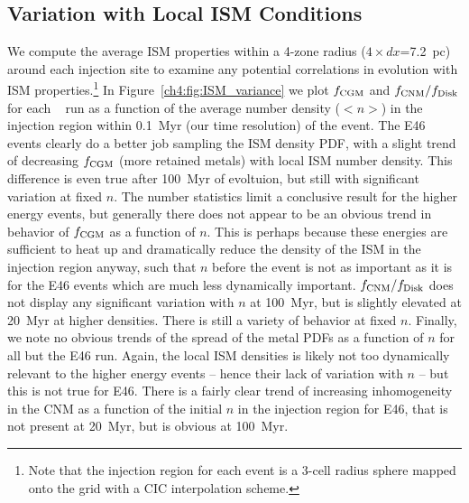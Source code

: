 \subsection{Variation with Local ISM Conditions}
\label{ch4:sec:ISM density}

We compute the average ISM properties within a 4-zone radius ($4 \times dx$=7.2~pc) around each injection site to examine any potential correlations in evolution with ISM properties.\footnote{Note that the injection region for each event is a 3-cell radius sphere mapped onto the grid with a CIC interpolation scheme.} In Figure~\ref{ch4:fig:ISM_variance} we plot $f_{\rm CGM}$ and $f_{\rm CNM} / f_{\rm Disk}$ for each \runonenu~ run as a function of the average number density ($<n>$) in the injection region within 0.1~Myr (our time resolution) of the event. The E46 events clearly do a better job sampling the ISM density PDF, with a slight trend of decreasing $f_{\rm CGM}$ (more retained metals) with local ISM number density. This difference is even true after 100~Myr of evoltuion, but still with significant variation at fixed $n$. The number statistics limit a conclusive result for the higher energy events, but generally there does not appear to be an obvious trend in behavior of $f_{\rm CGM}$ as a function of $n$. This is perhaps because these energies are sufficient to heat up and dramatically reduce the density of the ISM in the injection region anyway, such that $n$ before the event is not as important as it is for the E46 events which are much less dynamically important. $f_{\rm CNM} / f_{\rm Disk}$ does not display any significant variation with $n$ at 100~Myr, but is slightly elevated at 20~Myr at higher densities. There is still a variety of behavior at fixed $n$. Finally, we note no obvious trends of the spread of the metal PDFs as a function of $n$ for all but the E46 run. Again, the local ISM densities is likely not too dynamically relevant to the higher energy events -- hence their lack of variation with $n$ -- but this is not true for E46. There is a fairly clear trend of increasing inhomogeneity in the CNM as a function of the initial $n$ in the injection region for E46, that is not present at 20~Myr, but is obvious at 100~Myr.


